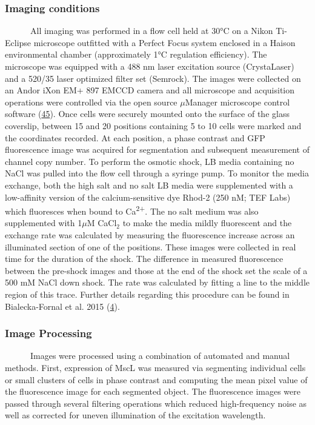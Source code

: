 \subsubsection{Imaging
conditions}\label{imaging-conditions}

~ ~ ~
~All
imaging
was
performed
in a
flow
cell
held
at
30°C
on a
Nikon
Ti-Eclipse
microscope
outfitted
with a
Perfect
Focus
system
enclosed
in a
Haison
environmental
chamber
(approximately
1°C
regulation
efficiency).
The
microscope
was
equipped
with a
488 nm
laser
excitation
source
(CrystaLaser)
and a
520/35
laser
optimized
filter
set
(Semrock).
The
images
were
collected
on an
Andor
iXon
EM+
897
EMCCD
camera
and
all
microscope
and
acquisition
operations
were
controlled
via
the
open
source
\(\mu\)Manager
microscope
control
software
(\protect\hyperlink{ref-edelstein2014}{45}).
Once
cells
were
securely
mounted
onto
the
surface
of the
glass
coverslip,
between
15 and
20
positions
containing
5 to
10
cells
were
marked
and
the
coordinates
recorded.
At
each
position,
a
phase
contrast
and
GFP
fluorescence
image
was
acquired
for
segmentation
and
subsequent
measurement
of
channel
copy
number.
To
perform
the
osmotic
shock,
LB
media
containing
no
NaCl
was
pulled
into
the
flow
cell
through
a
syringe
pump.
To
monitor
the
media
exchange,
both
the
high
salt
and no
salt
LB
media
were
supplemented
with a
low-affinity
version
of the
calcium-sensitive
dye
Rhod-2
(250
nM;
TEF
Labs)
which
fluoresces
when
bound
to
Ca\textsuperscript{2+}.
The no
salt
medium
was
also
supplemented
with
1\(\mu\)M
CaCl\(_2\)
to
make
the
media
mildly
fluorescent
and
the
exchange
rate
was
calculated
by
measuring
the
fluorescence
increase
across
an
illuminated
section
of one
of the
positions.
These
images
were
collected
in
real
time
for
the
duration
of the
shock.
The
difference
in
measured
fluorescence
between
the
pre-shock
images
and
those
at the
end of
the
shock
set
the
scale
of a
500 mM
NaCl
down
shock.
The
rate
was
calculated
by
fitting
a line
to the
middle
region
of
this
trace.
Further
details
regarding
this
procedure
can be
found
in
Bialecka-Fornal
et al.
2015
(\protect\hyperlink{ref-bialecka-fornal2015}{4}).

\subsubsection{Image
Processing}\label{image-processing}

~ ~ ~
~Images
were
processed
using
a
combination
of
automated
and
manual
methods.
First,
expression
of
MscL
was
measured
via
segmenting
individual
cells
or
small
clusters
of
cells
in
phase
contrast
and
computing
the
mean
pixel
value
of the
fluorescence
image
for
each
segmented
object.
The
fluorescence
images
were
passed
through
several
filtering
operations
which
reduced
high-frequency
noise
as
well
as
corrected
for
uneven
illumination
of the
excitation
wavelength.

